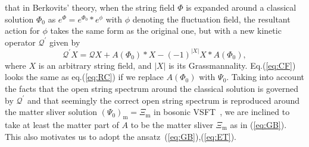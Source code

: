 \documentclass[a4paper,12pt]{article}
\newcommand{\cQ}{\mathcal{Q}}
\begin{document}
that in Berkovits' theory, when the string field $\Phi$ is expanded around a classical 
solution $\Phi_0$ as $e^{\Phi}=e^{\Phi_0}*e^{\phi}$ with $\phi$ denoting the fluctuation field, 
the resultant action for $\phi$ takes the same form as the original one, but with a new 
kinetic operator $\cQ^{\prime}$ given by 
\begin{equation}
\cQ^{\prime}X=\cQ X+A(\Phi_0)*X-(-1)^{|X|}X*A(\Phi_0), \label{eq:CF}
\end{equation}
where $X$ is an arbitrary string field, and $|X|$ is its Grassmannality. 
Eq.(\ref{eq:CF}) looks the same as eq.(\ref{eq:RC}) if we replace $A(\Phi_0)$ with $\Psi_0$. 
Taking into account the facts that the open string spectrum around the classical 
solution is governed by $\cQ^{\prime}$ and that 
seemingly the correct open string spectrum is reproduced around the matter sliver 
solution $(\Psi_0)_{\mathrm{m}}=\Xi_{\mathrm{m}}$ in bosonic VSFT~\cite{HK,HM,RSZ6,HMT,RV,Okawa}, 
we are inclined to take at least the matter part of $A$ to be the matter sliver $\Xi_{\mathrm{m}}$ 
as in (\ref{eq:GB}). This also motivates us to adopt the ansatz~(\ref{eq:GB}),(\ref{eq:ET}). 
\smallskip
\end{document}

